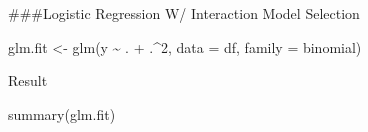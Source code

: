 \documentclass[
]{article}
\newenvironment{Shaded}{\begin{snugshade}}{\end{snugshade}}
\newcommand{\AttributeTok}[1]{\textcolor[rgb]{0.77,0.63,0.00}{#1}}
\newcommand{\DecValTok}[1]{\textcolor[rgb]{0.00,0.00,0.81}{#1}}
\newcommand{\FunctionTok}[1]{\textcolor[rgb]{0.00,0.00,0.00}{#1}}
\newcommand{\NormalTok}[1]{#1}
\newcommand{\OtherTok}[1]{\textcolor[rgb]{0.56,0.35,0.01}{#1}}
\newcommand{\SpecialCharTok}[1]{\textcolor[rgb]{0.00,0.00,0.00}{#1}}
\begin{document}
\#\#\#Logistic Regression W/ Interaction Model Selection

\begin{Shaded}
\begin{Highlighting}[]
\NormalTok{glm.fit }\OtherTok{\textless{}{-}} \FunctionTok{glm}\NormalTok{(y }\SpecialCharTok{\textasciitilde{}}\NormalTok{ . }\SpecialCharTok{+}\NormalTok{ .}\SpecialCharTok{\^{}}\DecValTok{2}\NormalTok{, }\AttributeTok{data =}\NormalTok{ df, }\AttributeTok{family =}\NormalTok{ binomial)}
\end{Highlighting}
\end{Shaded}

Result

\begin{Shaded}
\begin{Highlighting}[]
\FunctionTok{summary}\NormalTok{(glm.fit)}
\end{Highlighting}
\end{Shaded}
\end{document}
